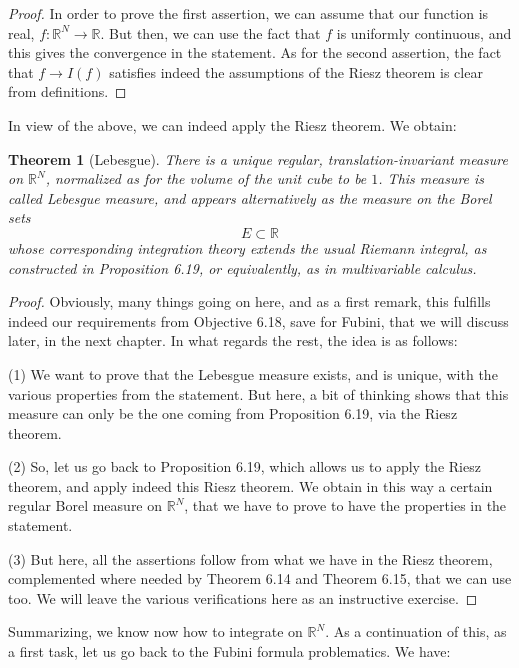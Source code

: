 \documentclass[12pt]{amsbook}
\newtheorem{theorem}{Theorem}[chapter]
\begin{document}
\begin{proof}
In order to prove the first assertion, we can assume that our function is real, $f:\mathbb R^N\to\mathbb R$. But then, we can use the fact that $f$ is uniformly continuous, and this gives the convergence in the statement. As for the second assertion, the fact that $f\to I(f)$ satisfies indeed the assumptions of the Riesz theorem is clear from definitions.
\end{proof}

In view of the above, we can indeed apply the Riesz theorem. We obtain:

\begin{theorem}[Lebesgue]
There is a unique regular, translation-invariant measure on $\mathbb R^N$, normalized as for the volume of the unit cube to be $1$. This measure is called Lebesgue measure, and appears alternatively as the measure on the Borel sets 
$$E\subset\mathbb R$$
whose corresponding integration theory extends the usual Riemann integral, as constructed in Proposition 6.19, or equivalently, as in multivariable calculus.
\end{theorem}

\begin{proof}
Obviously, many things going on here, and as a first remark, this fulfills indeed our requirements from Objective 6.18, save for Fubini, that we will discuss later, in the next chapter. In what regards the rest, the idea is as follows:

\medskip

(1) We want to prove that the Lebesgue measure exists, and is unique, with the various properties from the statement. But here, a bit of thinking shows that this measure can only be the one coming from Proposition 6.19, via the Riesz theorem.

\medskip

(2) So, let us go back to Proposition 6.19, which allows us to apply the Riesz theorem, and apply indeed this Riesz theorem. We obtain in this way a certain regular Borel measure on $\mathbb R^N$, that we have to prove to have the properties in the statement.

\medskip

(3) But here, all the assertions follow from what we have in the Riesz theorem, complemented where needed by Theorem 6.14 and Theorem 6.15, that we can use too. We will leave the various verifications here as an instructive exercise. 
\end{proof}

Summarizing, we know now how to integrate on $\mathbb R^N$. As a continuation of this, as a first task, let us go back to the Fubini formula problematics. We have:
\end{document}

